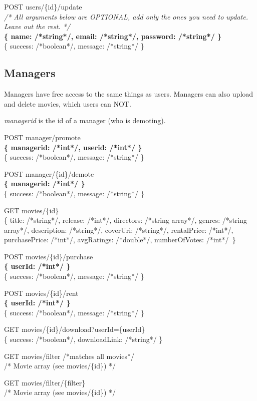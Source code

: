 POST users/\{id\}/update\\
\emph{/* All arguments below are OPTIONAL, add only the ones you need to update. Leave out the rest. */} \\
\textbf{\{ name: /*string*/, email: /*string*/, password: /*string*/ \}\\}
\{ success: /*boolean*/, message: /*string*/ \}

\subsection{Managers}

Managers have free access to the same things as users. Managers can also upload and delete movies, which users can NOT.

\emph{managerid} is the id of a manager (who is demoting).

POST manager/promote\\
\textbf{\{ managerid: /*int*/, userid: /*int*/ \}} \\
\{ success: /*boolean*/, message: /*string*/ \}

POST manager/\{id\}/demote \\
\textbf{\{ managerid: /*int*/ \}} \\
\{ success: /*boolean*/, message: /*string*/ \}

GET  movies/\{id\} \\
\{ title: /*string*/, release: /*int*/, directors: /*string array*/, genres: /*string array*/, description: /*string*/, coverUri: /*string*/, rentalPrice: /*int*/, purchasePrice: /*int*/, avgRatings: /*double*/, numberOfVotes: /*int*/\ \}

POST movies/\{id\}/purchase \\
\textbf{\{ userId: /*int*/ \}} \\
\{ success: /*boolean*/, message: /*string*/ \}

POST movies/\{id\}/rent \\
\textbf{\{ userId: /*int*/ \}} \\
\{ success: /*boolean*/, message: /*string*/ \}

GET movies/\{id\}/download?userId=\{userId\} \\
\{ success: /*boolean*/, downloadLink: /*string*/ \}

GET  movies/filter /*matches all movies*/ \\
/* Movie array (see movies/\{id\}) */

GET  movies/filter/\{filter\} \\
/* Movie array (see movies/\{id\}) */

